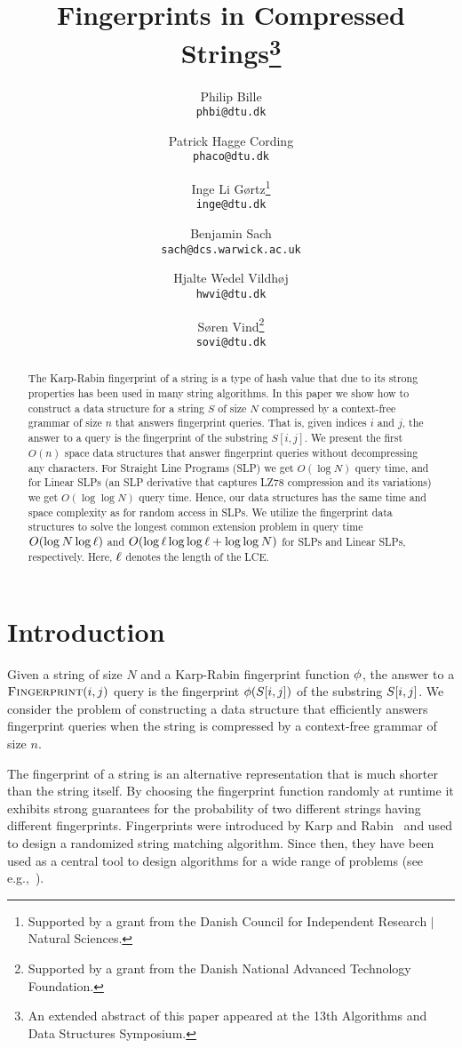 \documentclass[11pt]{article}
\title{Fingerprints in Compressed Strings\footnote{An extended abstract of this paper appeared at the 13th Algorithms and Data Structures Symposium.}}
\author{Philip Bille \\ \texttt{phbi@dtu.dk} \and Patrick Hagge Cording \\ \texttt{phaco@dtu.dk} \and Inge Li G{\o}rtz\thanks{Supported by a grant from the Danish Council for Independent Research $\vert$ Natural Sciences.} \\ \texttt{inge@dtu.dk} \and Benjamin Sach \\ \texttt{sach@dcs.warwick.ac.uk} \and Hjalte Wedel Vildh{\o}j \\ \texttt{hwvi@dtu.dk} \and S{\o}ren Vind\thanks{Supported by a grant from the Danish National Advanced Technology Foundation.} \\ \texttt{sovi@dtu.dk}}
\newcommand{\fingerprintq}{\ensuremath{\textsc{Fingerprint}}}
\newcommand{\fp}{\ensuremath\phi}
\newcommand{\lce}{\ensuremath\ell}
\begin{document}
	
\maketitle

\begin{abstract}
\noindent The Karp-Rabin fingerprint of a string is a type of hash value that due to its strong properties has been used in many string algorithms. In this paper we show how to construct a data structure for a string $S$ of size $N$ compressed by a context-free grammar of size $n$ that answers fingerprint queries. That is, given indices $i$ and $j$, the answer to a query is the fingerprint of the substring $S[i,j]$. We present the first $O(n)$ space data structures that answer fingerprint queries without decompressing any characters. For Straight Line Programs (SLP) we get $O(\log N)$ query time, and for Linear SLPs (an SLP derivative that captures LZ78 compression and its variations) we get $O(\log \log N)$ query time. Hence, our data structures has the same time and space complexity as for random access in SLPs. We utilize the fingerprint data structures to solve the longest common extension problem in query time $O(\log N\log \lce)$ and $O(\log \lce \log\log \lce + \log\log N)$ for SLPs and Linear SLPs, respectively. Here, $\lce$ denotes the length of the LCE.
\end{abstract}


\section{Introduction}
Given a string \str of size $N$ and a Karp-Rabin fingerprint function $\fp$, the answer to a $\fingerprintq(i, j)$ query is the fingerprint $\fp(\str[i, j])$ of the substring $S[i, j]$. We consider the problem of constructing a data structure that efficiently answers fingerprint queries when the string is compressed by a context-free grammar of size $n$.

The fingerprint of a string is an alternative representation that is much shorter than the string itself. By choosing the fingerprint function randomly at runtime it exhibits strong guarantees for the probability of two different strings having different fingerprints. Fingerprints were introduced by Karp and Rabin~\cite{karp1987efficient} and used to design a randomized string matching algorithm. Since then, they have been used as a central tool to design algorithms for a wide range of problems (see e.g.,~\cite{amir1992efficient, andoni2006efficient, cole2003faster, cormode2005substring, cormode2007string, farach1998string, gasieniec1996randomized, kalai2002efficient, porat2009exact}). 
\end{document}
